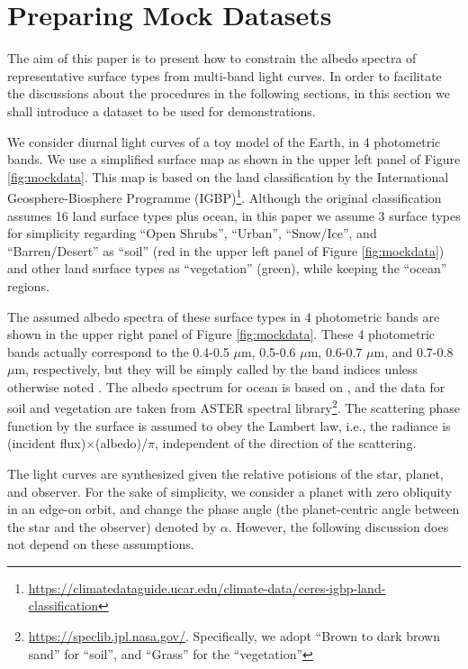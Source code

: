 \documentclass[iop,numberedappendix,apj,]{emulateapj}
\begin{document}
\section{Preparing Mock Datasets}
\label{s:mockdata}

The aim of this paper is to present how to constrain the albedo spectra of representative surface types from multi-band light curves. 
In order to facilitate the discussions about the procedures in the following sections, in this section we shall introduce a dataset to be used for demonstrations. 

We consider diurnal light curves of a toy model of the Earth, in 4 photometric bands. 
We use a simplified surface map as shown in the upper left panel of Figure \ref{fig:mockdata}. 
This map is based on the land classification by the International Geosphere-Biosphere Programme (IGBP)\footnote{\url{https://climatedataguide.ucar.edu/climate-data/ceres-igbp-land-classification}}. 
Although the original classification assumes 16 land surface types plus ocean, in this paper we assume 3 surface types for simplicity regarding ``Open Shrubs'', ``Urban'', ``Snow/Ice'', and ``Barren/Desert'' as ``soil'' (red in the upper left panel of Figure \ref{fig:mockdata}) and other land surface types as ``vegetation'' (green), while keeping the ``ocean'' regions. 


The assumed albedo spectra of these surface types in 4 photometric bands are shown in the upper right panel of Figure \ref{fig:mockdata}. 
These 4 photometric bands actually correspond to the 0.4-0.5 $\mu $m, 0.5-0.6 $\mu $m, 0.6-0.7 $\mu $m, and 0.7-0.8 $\mu $m, respectively, but they will be simply called by the band indices unless otherwise noted . 
The albedo spectrum for ocean is based on \citet{Mclinden1997}, 
and the data for soil and vegetation are taken from ASTER spectral library\footnote{\url{https://speclib.jpl.nasa.gov/}. 
Specifically, we adopt  ``Brown to dark brown sand'' for ``soil'', and ``Grass'' for the ``vegetation''}. 
The scattering phase function by the surface is assumed to obey the Lambert law, i.e., the radiance is (incident flux)$\times $(albedo)/$\pi$, independent of the direction of the scattering. 

The light curves are synthesized given the relative potisions of the star, planet, and observer.  
For the sake of simplicity, we consider a planet with zero obliquity in an edge-on orbit, and change the phase angle (the planet-centric angle between the star and the observer) denoted by $\alpha $. 
However, the following discussion does not depend on these assumptions. 
\end{document}
